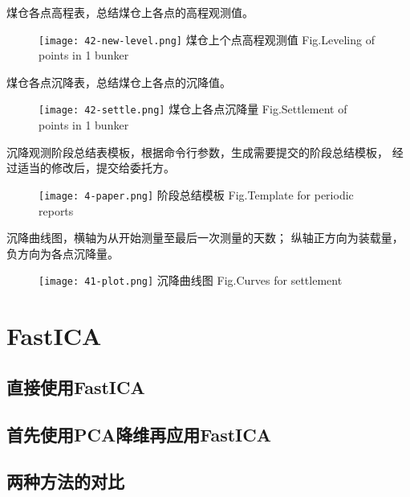 \newpage
煤仓各点高程表，总结煤仓上各点的高程观测值。
\begin{figure}[!htbp]
   \centering
   \texttt{[image: 42-new-level.png]}
					{煤仓上个点高程观测值}
			{Fig.}{Leveling of points in 1 bunker}
\end{figure}

煤仓各点沉降表，总结煤仓上各点的沉降值。
\begin{figure}[!htbp]
   \centering
   \texttt{[image: 42-settle.png]}
					{煤仓上各点沉降量}
			{Fig.}{Settlement of points in 1 bunker}
\end{figure}
\newpage

沉降观测阶段总结表模板，根据命令行参数，生成需要提交的阶段总结模板，
经过适当的修改后，提交给委托方。
\begin{figure}[!htbp]
   \centering
   \texttt{[image: 4-paper.png]}
				    {阶段总结模板}
			{Fig.}{Template for periodic reports}
\end{figure}

沉降曲线图，横轴为从开始测量至最后一次测量的天数；
纵轴正方向为装载量，负方向为各点沉降量。
\begin{figure}[!htbp]
   \centering
   \texttt{[image: 41-plot.png]}
				    {沉降曲线图}
			{Fig.}{Curves for settlement}
\end{figure}


\section{FastICA}
\subsection{直接使用FastICA}
\subsection{首先使用PCA降维再应用FastICA}
\subsection{两种方法的对比}
